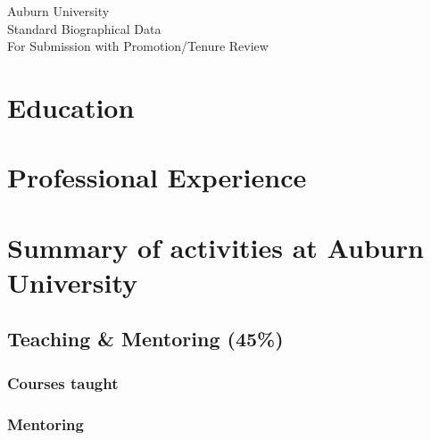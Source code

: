 


\newcommand{\longcontent}[1]{#1}

\newcommand{\oldcontent}[1]{}

\newcommand{\docTitle}{Biographical Data\xspace}


\thispagestyle{empty}
\singlespacing

\begin{mytitle}
    Auburn University \\
    Standard Biographical Data \\
    For Submission with Promotion/Tenure Review
\end{mytitle}



\section{Education}


\section{Professional Experience}


\section{Summary of activities at Auburn University}

\subsection{Teaching \& Mentoring (45\%)}

\subsubsection{Courses taught}


\subsubsection{Mentoring}


